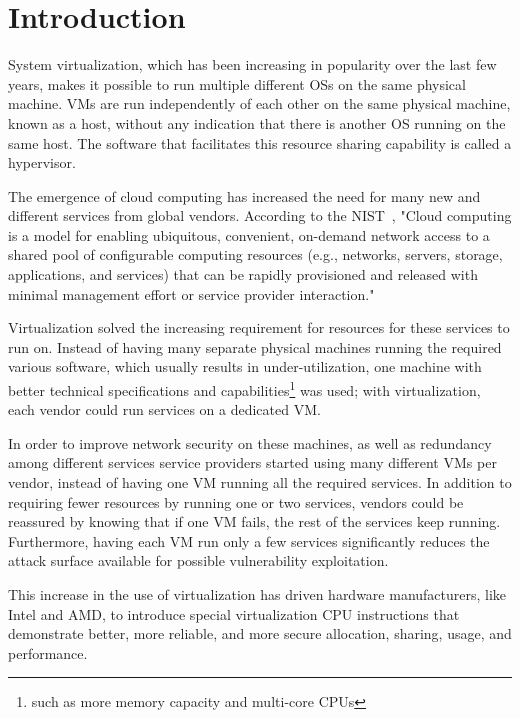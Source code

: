 \chapter{Introduction}\label{ch:intro}

System virtualization, which has been increasing in popularity over the last few years, makes it possible to run multiple different \acp{OS} on the same physical machine. \acp{VM} are run independently of each other on the same physical machine, known as a host, without any indication that there is another \ac{OS} running on the same host. The software that facilitates this resource sharing capability is called a hypervisor.

\par The emergence of cloud computing has increased the need for many new and different services from global vendors. According to the \ac{NIST}~\cite{mell2011nist}, "Cloud computing is a model for enabling ubiquitous, convenient, on-demand network access to a shared pool of configurable computing resources (e.g., networks, servers, storage, applications, and services) that can be rapidly provisioned and released with minimal management effort or service provider interaction."  

\par Virtualization solved the increasing requirement for resources for these services to run on. Instead of having many separate physical machines running the required various software, which usually results in under-utilization, one machine with better technical specifications and capabilities\footnote{such as more memory capacity and multi-core \acp{CPU}} was used; with virtualization, each vendor could run services on a dedicated \ac{VM}. 

\par In order to improve network security on these machines, as well as redundancy among different services service providers started using many different \acp{VM} per vendor, instead of having one \ac{VM} running all the required services. In addition to requiring fewer resources by running one or two services, vendors could be reassured by knowing that if one VM fails, the rest of the services keep running. Furthermore, having each \ac{VM} run only a few services significantly reduces the attack surface available for possible vulnerability exploitation.

\par This increase in the use of virtualization has driven hardware manufacturers, like Intel and AMD, to introduce special virtualization \ac{CPU} instructions that demonstrate better, more reliable, and more secure allocation, sharing, usage, and performance.

